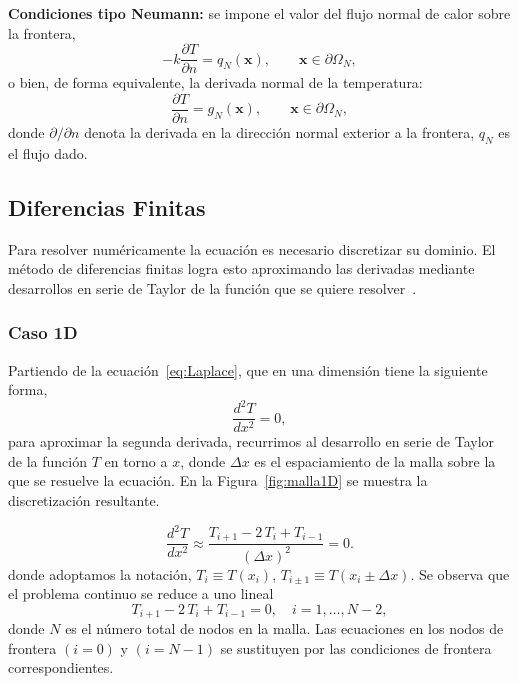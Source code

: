 \documentclass[11pt,a4paper,twocolumn]{article}
\begin{document}
\textbf{Condiciones tipo Neumann:} se impone el valor del flujo normal de calor sobre la frontera,
\begin{equation}
-k\frac{\partial T}{\partial n} = q_N(\mathbf{x}), \qquad \mathbf{x} \in \partial\Omega_N,
\label{eq:Neumann}
\end{equation}
o bien, de forma equivalente, la derivada normal de la temperatura:
\begin{equation}
\frac{\partial T}{\partial n} = g_N(\mathbf{x}), \qquad \mathbf{x} \in \partial\Omega_N,
\end{equation}
donde $\partial/\partial n$ denota la derivada en la dirección normal exterior a la frontera,
$q_{N}$ es el flujo dado.

%
\subsection{Diferencias Finitas}
Para resolver numéricamente la ecuación es necesario discretizar su dominio.
El método de diferencias finitas logra esto aproximando las derivadas mediante
desarrollos en serie de Taylor de la función que se quiere resolver~\cite{Chung2002, Patankar1980}.

\subsubsection{Caso 1D}

Partiendo de la ecuación~\eqref{eq:Laplace}, que en una dimensión tiene la siguiente forma,
\begin{equation}
       \frac{d^2 T}{dx^2} = 0,
\end{equation}
para aproximar la segunda derivada, recurrimos al desarrollo en serie de Taylor de la función $T$
en torno a $x$, donde $\Delta x$ es el espaciamiento de la malla sobre la que se resuelve la ecuación.
En la Figura~\ref{fig:malla1D} se muestra la discretización resultante.

\begin{equation}
       \frac{d^2 T}{d x^2} \approx \frac{T_{i+1} - 2 \, T_{i} + T_{i-1}}{(\Delta x)^2}
       = 0.
\end{equation}
donde adoptamos la notación,
$T_i \equiv T(x_i)$, $T_{i\pm 1} \equiv T(x_i \pm \Delta x)$. Se observa que el problema continuo
se reduce a uno lineal
\begin{equation}
    T_{i+1} - 2\, T_i + T_{i-1} = 0, \quad i = 1, \dots, N-2,
    \label{eq:laplaceDisc}
\end{equation}
donde $N$ es el número total de nodos en la malla. Las ecuaciones en los nodos de frontera
$(i=0)$ y $(i=N-1)$ se sustituyen por las condiciones de frontera correspondientes.
\end{document}
